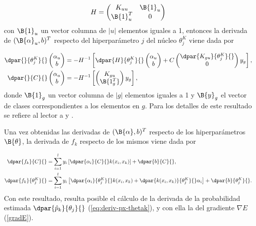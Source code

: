 \begin{align}
  H=\begin{pmatrix} K_{uu} & \B{1}_u \\ \B{1}_u^T & 0
  \end{pmatrix}
\end{align}
con $\B{1}_u$ un vector columna de $|u|$ elementos iguales a 1,
entonces la derivada de $(\B{\alpha}_u,b)^T$ respecto del
hiperparámetro $j$ del núcleo $\theta^K_j$ viene dada por

\begin{align}
  \dpar{}{\theta^K_j}{} \begin{pmatrix}\alpha_{u}\\b\end{pmatrix} &=
    -H^{-1} \left[
      \dpar{H}{\theta^K_j}{}
      \begin{pmatrix}\alpha_{u}\\b\end{pmatrix}
        +C \begin{pmatrix}\dpar{K_{gu}}{\theta^K_j}{}\\0\end{pmatrix}
          y_g
          \right], \\
  \dpar{}{C}{} \begin{pmatrix}\alpha_{u}\\b\end{pmatrix} &=
    -H^{-1} \left[
      \begin{pmatrix}{K_{gu}}\\\B{1_g^T}\end{pmatrix} y_g
      \right],
\end{align}
donde $\B{1}_g$ un vector columna de $|g|$ elementos iguales a 1 y
$\B{y}_g$ el vector de clases correspondientes a los elementos en
$g$. Para los detalles de este resultado se refiere al lector a
\cite{glasmachers} y \cite{keerthi}.

Una vez obtenidas las derivadas de $({\B{\alpha},b})^T$ respecto de
los hiperparámetros $\B{\theta}$, la derivada de $f_k$  respecto
de los mismos viene dada por

\begin{align}
  \dpar{f_k}{C}{} &=  \sum_{i=1}^l y_i\left[
    \dpar{\alpha_i}{C}{} k(x_i,x_k) \right]
  + \dpar{b}{C}{} ,\\
  \dpar{f_k}{\theta^K_j}{} &=  \sum_{i=1}^l y_i \left[
    \dpar{\alpha_i}{\theta^K_j}{} k(x_i,x_k) +
    \dpar{k(x_i,x_k)}{\theta^K_j}{} \alpha_i \right]
  + \dpar{b}{\theta^K_j}{}. 
\end{align}
Con este resultado, resulta posible el cálculo de la derivada de la
probabilidad estimada $\dpar{\hat{p}_k}{\theta_j}{}$
(\autoref{eq:deriv-px-thetak}), y con ella la del gradiente
$\nabla{}E$ (\autoref{gradE}).

